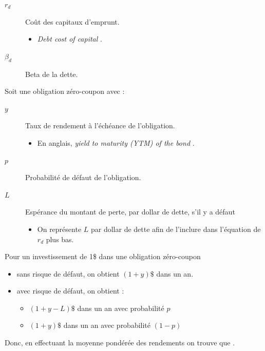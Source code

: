 \documentclass[10pt, french]{article}
\begin{document}
\begin{multicols*}{2}
\begin{distributions}[Notation]
\begin{description}
	\item[$r_{d}$]	Coût des capitaux d'emprunt.
		\begin{itemize}
		\item	\og \textit{Debt cost of capital} \fg{}.
		\end{itemize}
	\item[$\beta_{d}$]	Beta de la dette.
\end{description}

Soit une obligation zéro-coupon avec :
\begin{description}
	\item[$y$]	Taux de rendement à l'échéance de l'obligation.
		\begin{itemize}
		\item	En anglais, \og \textit{yield to maturity (YTM) of the bond} \fg{}.
		\end{itemize}
	\item[$p$]	Probabilité de défaut de l'obligation.
	\item[$L$]	Espérance du montant de perte, par dollar de dette, s'il y a défaut
		\begin{itemize}
		\item	On représente $L$ par dollar de dette afin de l'inclure dans l'équation de $r_{d}$ plus bas.
		\end{itemize}
\end{description}
\end{distributions}


\begin{definitionNOHFILLsub}
Pour un investissement de 1\$ dans une obligation zéro-coupon
\begin{itemize}
	\item	sans risque de défaut, on obtient $(1 + y)\$$ dans un an.
	\item	avec risque de défaut, on obtient :
		\begin{itemize}
		\item	$(1 + y - L)\$$ dans un an avec probabilité $p$
		\item	$(1 + y)\$$ dans un an avec probabilité $(1 - p)$
		\end{itemize}
\end{itemize}

Donc, en effectuant la moyenne pondérée des rendements on trouve que .
\end{definitionNOHFILLsub}


\end{multicols*}
\end{document}
